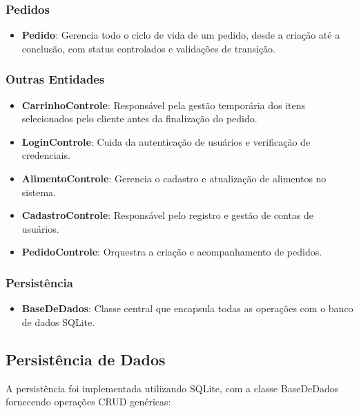 \documentclass[conference]{IEEEtran}
\begin{document}
\subsubsection{Pedidos}
\begin{itemize}
    \item \textbf{Pedido}: Gerencia todo o ciclo de vida de um pedido, desde a criação até a conclusão, com status controlados e validações de transição.
\end{itemize}

\subsubsection{Outras Entidades}
\begin{itemize}
    \item \textbf{CarrinhoControle}: Responsável pela gestão temporária dos itens selecionados pelo cliente antes da finalização do pedido.
    
    \item \textbf{LoginControle}: Cuida da autenticação de usuários e verificação de credenciais.
    
    \item \textbf{AlimentoControle}: Gerencia o cadastro e atualização de alimentos no sistema.
    
    \item \textbf{CadastroControle}: Responsável pelo registro e gestão de contas de usuários.
    
    \item \textbf{PedidoControle}: Orquestra a criação e acompanhamento de pedidos.
\end{itemize}

\subsubsection{Persistência}
\begin{itemize}
    \item \textbf{BaseDeDados}: Classe central que encapsula todas as operações com o banco de dados SQLite.
\end{itemize}

\subsection{Persistência de Dados}
A persistência foi implementada utilizando SQLite, com a classe BaseDeDados fornecendo operações CRUD genéricas:
\end{document}
